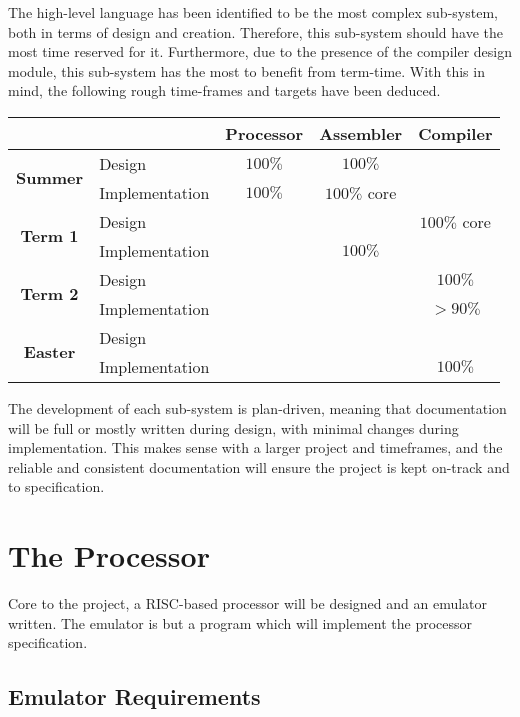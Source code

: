 \documentclass{article}
\begin{document}
The high-level language has been identified to be the most complex sub-system, both in terms of design and creation.
Therefore, this sub-system should have the most time reserved for it.
Furthermore, due to the presence of the compiler design module, this sub-system has the most to benefit from term-time.
With this in mind, the following rough time-frames and targets have been deduced.

\medskip
\begin{longtable}{|c|l|c|c|c|}
    \hline
    \multicolumn{2}{|c|}{} & \textbf{Processor} & \textbf{Assembler} & \textbf{Compiler} \\
    \hline
    \multirow{2}{*}{\textbf{Summer}} & Design & \(100\%\) & \(100\%\) & \\
    \cline{2-5}
    & Implementation & \(100\%\) & \(100\%\) core & \\
    \hline
    \multirow{2}{*}{\textbf{Term 1}} & Design & & & \(100\%\) core \\
    \cline{2-5}
    & Implementation & & \(100\%\) & \\
    \hline
    \multirow{2}{*}{\textbf{Term 2}} & Design & & & \(100\%\) \\
    \cline{2-5}
    & Implementation & & & \(> 90\%\) \\
    \hline
    \multirow{2}{*}{\textbf{Easter}} & Design & & & \\
    \cline{2-5}
    & Implementation & & & \(100\%\) \\
    \hline
\end{longtable}
\medskip

The development of each sub-system is plan-driven, meaning that documentation will be full or mostly written during design, with minimal changes during implementation.
This makes sense with a larger project and timeframes, and the reliable and consistent documentation will ensure the project is kept on-track and to specification.

\section{The Processor}

Core to the project, a RISC-based processor will be designed and an emulator written.
The emulator is but a program which will implement the processor specification.

\subsection{Emulator Requirements}
\end{document}
